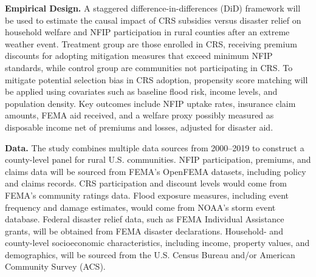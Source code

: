 \textbf{Empirical Design.} A staggered difference-in-differences (DiD) framework will be used to estimate the causal impact of CRS subsidies versus disaster relief on household welfare and NFIP participation in rural counties after an extreme weather event. Treatment group are those enrolled in CRS, receiving premium discounts for adopting mitigation measures that exceed minimum NFIP standards, while control group are communities not participating in CRS. To mitigate potential selection bias in CRS adoption, propensity score matching will be applied using covariates such as baseline flood risk, income levels, and population density. Key outcomes include NFIP uptake rates, insurance claim amounts, FEMA aid received, and a welfare proxy possibly measured as disposable income net of premiums and losses, adjusted for disaster aid.

\textbf{Data.} The study combines multiple data sources from 2000–2019 to construct a county-level panel for rural U.S. communities. NFIP participation, premiums, and claims data will be sourced from FEMA’s OpenFEMA datasets, including policy and claims records. CRS participation and discount levels would come from FEMA’s community ratings data. Flood exposure measures, including event frequency and damage estimates, would come from NOAA’s storm event database. Federal disaster relief data, such as FEMA Individual Assistance grants, will be obtained from FEMA disaster declarations. Household- and county-level socioeconomic characteristics, including income, property values, and demographics, will be sourced from the U.S. Census Bureau and/or American Community Survey (ACS).




